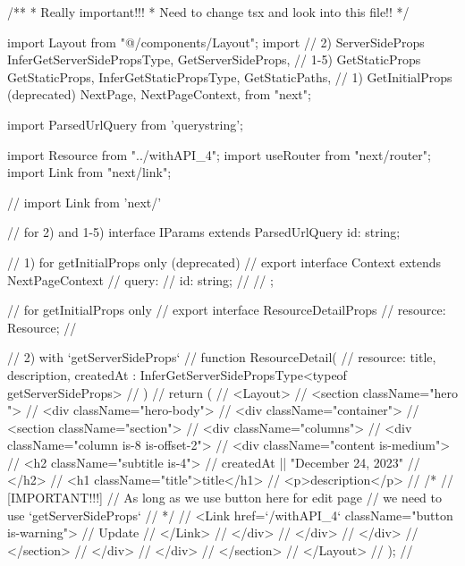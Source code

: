 /**
 * Really important!!!
 * Need to change tsx and look into this file!!
 */

import Layout from "@/components/Layout";
import { 
  // 2) ServerSideProps
  InferGetServerSidePropsType,
  GetServerSideProps,
  // 1-5) GetStaticProps
  GetStaticProps,
  InferGetStaticPropsType,
  GetStaticPaths,
  // 1) GetInitialProps (deprecated)
  NextPage,
  NextPageContext,
} from "next";

import { ParsedUrlQuery } from 'querystring';

import { Resource } from "../withAPI_4";
import { useRouter } from "next/router";
import Link from "next/link";

// import { Link } from 'next/'

// for 2) and 1-5)
interface IParams extends ParsedUrlQuery {
  id: string;
}

// 1) for getInitialProps only (deprecated)
// export interface Context extends NextPageContext {
//   query: {
//     id: string;
//   }  
// };

// for getInitialProps only
// export interface ResourceDetailProps {
//   resource:  Resource;
// }


// 2) with `getServerSideProps`
// function ResourceDetail(
//   { resource: { title, description, createdAt } }: InferGetServerSidePropsType<typeof getServerSideProps>
// ) {
//   return (
//     <Layout>
//       <section className="hero ">
//         <div className="hero-body">
//           <div className="container">
//             <section className="section">
//               <div className="columns">
//                 <div className="column is-8 is-offset-2">
//                   <div className="content is-medium">
//                     <h2 className="subtitle is-4">
//                       {createdAt || "December 24, 2023"}
//                     </h2>
//                     <h1 className="title">{title}</h1>
//                     <p>{description}</p>
//                     {/* 
//                       [IMPORTANT!!!]
//                       As long as we use button here for edit page
//                       we need to use `getServerSideProps`
//                     */}
//                     <Link href={`/withAPI_4`} className="button is-warning">
//                       Update
//                     </Link>
//                   </div>
//                 </div>
//               </div>
//             </section>
//           </div>
//         </div>
//       </section>
//     </Layout>
//   );
// }

